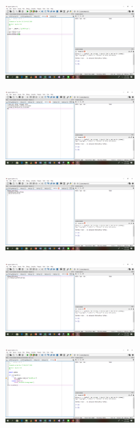 \begin{figure}[H]
 \includegraphics[width=5cm]{figures/4/1174074/Praktek/main2.png}
 \centering
\end{figure}

\begin{figure}[H]
 \includegraphics[width=5cm]{figures/4/1174074/Praktek/hasil1.png}
 \centering
\end{figure}

\begin{figure}[H]
 \includegraphics[width=5cm]{figures/4/1174074/Praktek/hasil3.png}
 \centering
\end{figure}

\begin{figure}[H]
 \includegraphics[width=5cm]{figures/4/1174074/Praktek/hasil5.png}
 \centering
\end{figure}

\begin{figure}[H]
 \includegraphics[width=5cm]{figures/4/1174074/Praktek/error.png}
 \centering
\end{figure}
